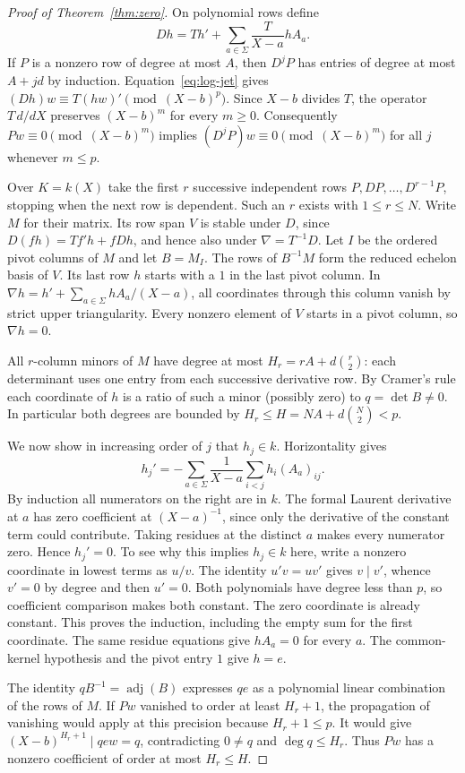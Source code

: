 \begin{proof}[Proof of Theorem~\ref{thm:zero}]
On polynomial rows define
\[
 D h=T h'+\sum_{a\in \Sigma}\frac{T}{X-a}h A_a .
\]
If $P$ is a nonzero row of degree at most $A$, then $D^jP$ has entries
of degree at most $A+jd$ by induction. Equation~\eqref{eq:log-jet}
gives $(Dh)w\equiv T(hw)'\pmod{(X-b)^p}$. Since $X-b$ divides $T$,
the operator $T\,d/dX$ preserves $(X-b)^m$ for every $m\ge0$.
Consequently $Pw\equiv0\pmod{(X-b)^m}$ implies
$(D^jP)w\equiv0\pmod{(X-b)^m}$ for all $j$ whenever $m\le p$.

Over $K=k(X)$ take the first $r$ successive independent rows
$P,DP,\ldots,D^{r-1}P$, stopping when the next row is dependent.
Such an $r$ exists with $1\le r\le N$. Write $M$ for their matrix.
Its row span $V$ is stable under $D$, since $D(fh)=Tf'h+fDh$,
and hence also under $\nabla=T^{-1}D$.
Let $I$ be the ordered pivot columns of $M$ and let $B=M_I$.
The rows of $B^{-1}M$ form the reduced echelon basis of $V$.
Its last row $h$ starts with a $1$ in the last pivot column.
In $\nabla h=h'+\sum_{a\in\Sigma} hA_a/(X-a)$, all coordinates through this
column vanish by strict upper triangularity. Every nonzero element
of $V$ starts in a pivot column, so $\nabla h=0$.

All $r$-column minors of $M$ have degree at most
$H_r=rA+d\binom r2$: each determinant uses one entry from each
successive derivative row. By Cramer's rule each coordinate of $h$
is a ratio of such a minor (possibly zero) to $q=\det B\ne0$.
In particular both degrees are bounded by $H_r\le H=NA+d\binom N2<p$.

We now show in increasing order of $j$ that $h_j\in k$.
Horizontality gives
\[
 h_j'=-\sum_{a\in \Sigma}\frac{1}{X-a}\sum_{i<j}h_i(A_a)_{ij}.
\]
By induction all numerators on the right are in $k$.
The formal Laurent derivative at $a$ has zero coefficient at
$(X-a)^{-1}$, since only the derivative of the constant term could
contribute. Taking residues at the distinct $a$ makes every numerator
zero. Hence $h_j'=0$. To see why this implies $h_j\in k$ here, write a
nonzero coordinate in lowest terms as $u/v$. The identity $u'v=uv'$
gives $v\mid v'$, whence $v'=0$ by degree and then $u'=0$.
Both polynomials have degree less than $p$, so coefficient comparison
makes both constant. The zero coordinate is already constant.
This proves the induction, including the empty sum for the first
coordinate. The same residue equations give $hA_a=0$ for every $a$.
The common-kernel hypothesis and the pivot entry $1$ give $h=e$.

The identity $q B^{-1}=\operatorname{adj}(B)$ expresses $qe$ as a
polynomial linear combination of the rows of $M$. If $Pw$ vanished
to order at least $H_r+1$, the propagation of vanishing would apply
at this precision because $H_r+1\le p$. It would give
$(X-b)^{H_r+1}\mid qew=q$, contradicting $0\ne q$ and $\deg q\le H_r$.
Thus $Pw$ has a nonzero coefficient of order at most $H_r\le H$.
\end{proof}

